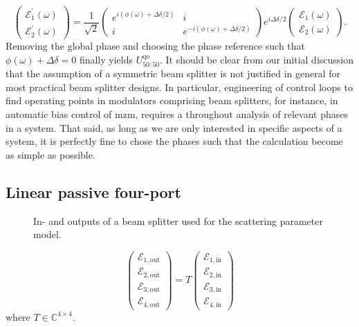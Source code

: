 \begin{equation}
    \begin{pmatrix}
        \mathcal{E}_1^\prime(\omega)
        \\
        \mathcal{E}_2^\prime(\omega)
    \end{pmatrix}
    =
    \frac{1}{\sqrt{2}}
    \begin{pmatrix}
        e^{i(\phi(\omega)+\Delta\delta/2)} & i
        \\
        i & e^{-i(\phi(\omega)+\Delta\delta/2)}
    \end{pmatrix}
    e^{i\Delta\delta/2}
    \begin{pmatrix}
        \mathcal{E}_1(\omega)
        \\
        \mathcal{E}_2(\omega)
    \end{pmatrix}
    .
\end{equation}
Removing the global phase and choosing the phase reference such that $\phi(\omega)+\Delta\delta=0$ finally yields $U_{50:50}^\text{qo}$.
It should be clear from our initial discussion that the assumption of a symmetric beam splitter is not justified in general for most practical beam splitter designs.
In particular, engineering of control loops to find operating points in modulators comprising beam splitters, for instance, in automatic bias control of \gls{mzm}, requires a throughout analysis of relevant phases in a system.
That said, as long as we are only interested in specific aspects of a system, it is perfectly fine to chose the phases such that the calculation become as simple as possible.

\FloatBarrier
\subsection{Linear passive four-port}
\begin{figure}[htb]
    \centering
    
    \caption{In- and outputs of a beam splitter used for the scattering parameter model.}\label{fig:beam_splitter_scattering_parameters}
\end{figure}

\begin{equation}
    \begin{pmatrix}
        \mathcal{E}_{1,\text{out}} \\
        \mathcal{E}_{2,\text{out}} \\
        \mathcal{E}_{3,\text{out}} \\
        \mathcal{E}_{4,\text{out}}
    \end{pmatrix}
    =
    T
    \begin{pmatrix}
        \mathcal{E}_{1,\text{in}} \\
        \mathcal{E}_{2,\text{in}} \\
        \mathcal{E}_{3,\text{in}} \\
        \mathcal{E}_{4,\text{in}}
    \end{pmatrix}
\end{equation}
where $T\in\mathbb{C}^{4\times4}$.

